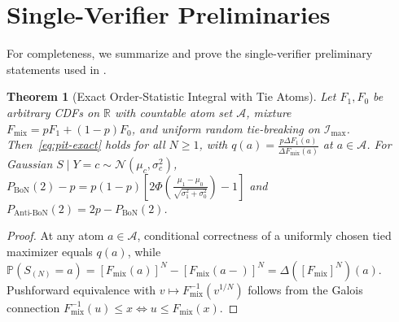 \documentclass[10pt]{article}
\theoremstyle{plain}
\newtheorem{theorem}{Theorem}
\theoremstyle{definition}
\theoremstyle{remark}
\newcommand{\R}{\mathbb{R}}
\newcommand{\Prob}{\mathbb{P}}
\newcommand{\Fmix}{F_{\mathrm{mix}}}
\begin{document}



\newpage
\appendix
{}

\section{Single-Verifier Preliminaries}
\label{app:preliminaries}

For completeness, we summarize and prove the single-verifier preliminary statements used in .

\begin{theorem}[Exact Order-Statistic Integral with Tie Atoms]
\label{thm:app-pit}
Let $F_1, F_0$ be arbitrary CDFs on $\R$ with countable atom set $\mathcal{A}$, mixture $\Fmix = p F_1 + (1-p)F_0$, and uniform random tie-breaking on $\mathcal{I}_{\max}$. Then~\eqref{eq:pit-exact} holds for all $N \ge 1$, with $q(a) = \frac{p\Delta F_1(a)}{\Delta\Fmix(a)}$ at $a \in \mathcal{A}$. For Gaussian $S \mid Y=c \sim \mathcal{N}(\mu_c, \sigma_c^2)$, $P_{\mathrm{BoN}}(2) - p = p(1-p)[2\Phi(\frac{\mu_1-\mu_0}{\sqrt{\sigma_1^2+\sigma_0^2}}) - 1]$ and $P_{\mathrm{Anti\text{-}BoN}}(2) = 2p - P_{\mathrm{BoN}}(2)$.
\end{theorem}
\begin{proof}
At any atom $a \in \mathcal{A}$, conditional correctness of a uniformly chosen tied maximizer equals $q(a)$, while $\Prob(S_{(N)} = a) = [\Fmix(a)]^N - [\Fmix(a-)]^N = \Delta([\Fmix]^N)(a)$. Pushforward equivalence with $v \mapsto \Fmix^{-1}(v^{1/N})$ follows from the Galois connection $\Fmix^{-1}(u) \le x \iff u \le \Fmix(x)$.
\end{proof}
\end{document}
